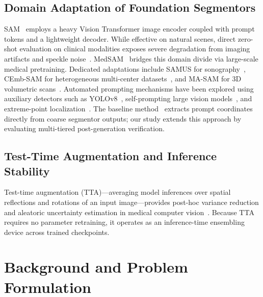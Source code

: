 \documentclass[journal,11pt,onecolumn,draftclsnofoot]{IEEEtran}
\begin{document}
\subsection{Domain Adaptation of Foundation Segmentors}
SAM~\cite{kirillov2023} employs a heavy Vision Transformer image encoder coupled with prompt tokens and a lightweight decoder. While effective on natural scenes, direct zero-shot evaluation on clinical modalities exposes severe degradation from imaging artifacts and speckle noise~\cite{deoliveira2023,he2023sam}. MedSAM~\cite{ma2023medsam} bridges this domain divide via large-scale medical pretraining. Dedicated adaptations include SAMUS for sonography~\cite{lin2023}, CEmb-SAM for heterogeneous multi-center datasets~\cite{shin2023}, and MA-SAM for 3D volumetric scans~\cite{chen2023}. Automated prompting mechanisms have been explored using auxiliary detectors such as YOLOv8~\cite{pandey2023}, self-prompting large vision models~\cite{wu2024}, and extreme-point localization~\cite{lei2023}. The baseline method~\cite{deshpande2024} extracts prompt coordinates directly from coarse segmentor outputs; our study extends this approach by evaluating multi-tiered post-generation verification.

\subsection{Test-Time Augmentation and Inference Stability}
Test-time augmentation (TTA)---averaging model inferences over spatial reflections and rotations of an input image---provides post-hoc variance reduction and aleatoric uncertainty estimation in medical computer vision~\cite{wang2019}. Because TTA requires no parameter retraining, it operates as an inference-time ensembling device across trained checkpoints.

\section{Background and Problem Formulation}
\label{sec:background}
\end{document}
